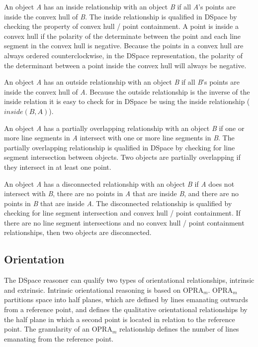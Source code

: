 \documentclass[12pt]{ucthesis}
\begin{document}
An object \emph{A} has an inside relationship with an object \emph{B} if all \emph{A}'s points are inside the convex hull of \emph{B}. The inside relationship is qualified in DSpace by checking the property of convex hull / point containment. A point is inside a convex hull if the polarity of the determinate between the point and each line segment in the convex hull is negative. Because the points in a convex hull are always ordered counterclockwise, in the DSpace representation, the polarity of the determinant between a point inside the convex hull will always be negative. 

An object \emph{A} has an outside relationship with an object \emph{B} if all \emph{B}'s points are inside the convex hull of \emph{A}. Because the outside relationship is the inverse of the inside relation it is easy to check for in DSpace be using the inside relationship ($inside(B,A)$). 

An object \emph{A} has a partially overlapping relationship with an object \emph{B} if one or more line segments in \emph{A} intersect with one or more line segments in \emph{B}. The partially overlapping relationship is qualified in DSpace by checking for line segment intersection between objects. Two objects are partially overlapping if they intersect in at least one point.  

An object \emph{A} has a disconnected relationship with an object \emph{B} if \emph{A} does not intersect with \emph{B}, there are no points in \emph{A} that are inside \emph{B}, and there are no points in \emph{B} that are inside \emph{A}. The disconnected relationship is qualified by checking for line segment intersection and convex hull / point containment. If there are no line segment intersections and no convex hull / point containment relationships, then two objects are disconnected.  

\subsection{Orientation} \label{orientation}
The DSpace reasoner can qualify two types of orientational relationships, intrinsic and extrinsic. Intrinsic orientational reasoning is based on OPRA$_{m}$. OPRA$_{m}$ partitions space into half planes, which are defined by lines emanating outwards from a reference point, and defines the qualitative orientational relationships by the half plane in which a second point is located in relation to the reference point. The granularity of an OPRA$_{m}$ relationship defines the number of lines emanating from the reference point. 
\end{document}
